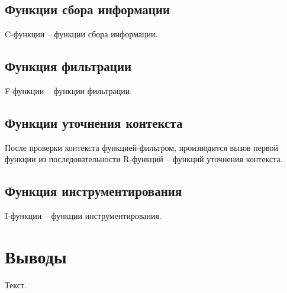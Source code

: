 \subsection{Функции сбора информации}

C-функции -- функции сбора информации.

\subsection{Функция фильтрации}

F-функции -- функции фильтрации.

\subsection{Функции уточнения контекста}

После проверки контекста функцией-фильтром, производится вызов первой функции из последовательности R-функций -- функций уточнения контекста.

\subsection{Функция инструментирования}

I-функции -- функции инструментирования.

\section{Выводы}

Текст.
